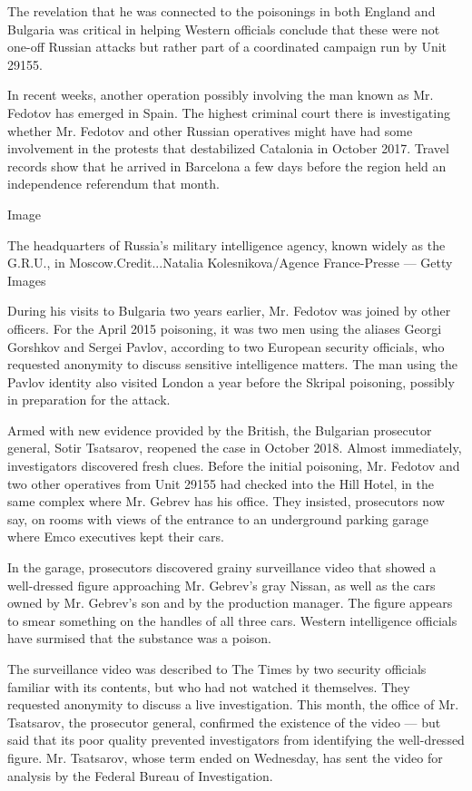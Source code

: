 The revelation that he was connected to the poisonings in both England
and Bulgaria was critical in helping Western officials conclude that
these were not one-off Russian attacks but rather part of a coordinated
campaign run by Unit 29155.

In recent weeks, another operation possibly involving the man known as
Mr. Fedotov has emerged in Spain. The highest criminal court there is
investigating whether Mr. Fedotov and other Russian operatives might
have had some involvement in the protests that destabilized Catalonia in
October 2017. Travel records show that he arrived in Barcelona a few
days before the region held an independence referendum that month.

Image

The headquarters of Russia's military intelligence agency, known widely
as the G.R.U., in Moscow.Credit...Natalia Kolesnikova/Agence
France-Presse --- Getty Images

During his visits to Bulgaria two years earlier, Mr. Fedotov was joined
by other officers. For the April 2015 poisoning, it was two men using
the aliases Georgi Gorshkov and Sergei Pavlov, according to two European
security officials, who requested anonymity to discuss sensitive
intelligence matters. The man using the Pavlov identity also visited
London a year before the Skripal poisoning, possibly in preparation for
the attack.

Armed with new evidence provided by the British, the Bulgarian
prosecutor general, Sotir Tsatsarov, reopened the case in October 2018.
Almost immediately, investigators discovered fresh clues. Before the
initial poisoning, Mr. Fedotov and two other operatives from Unit 29155
had checked into the Hill Hotel, in the same complex where Mr. Gebrev
has his office. They insisted, prosecutors now say, on rooms with views
of the entrance to an underground parking garage where Emco executives
kept their cars.

In the garage, prosecutors discovered grainy surveillance video that
showed a well-dressed figure approaching Mr. Gebrev's gray Nissan, as
well as the cars owned by Mr. Gebrev's son and by the production
manager. The figure appears to smear something on the handles of all
three cars. Western intelligence officials have surmised that the
substance was a poison.

The surveillance video was described to The Times by two security
officials familiar with its contents, but who had not watched it
themselves. They requested anonymity to discuss a live investigation.
This month, the office of Mr. Tsatsarov, the prosecutor general,
confirmed the existence of the video --- but said that its poor quality
prevented investigators from identifying the well-dressed figure. Mr.
Tsatsarov, whose term ended on Wednesday, has sent the video for
analysis by the Federal Bureau of Investigation.

